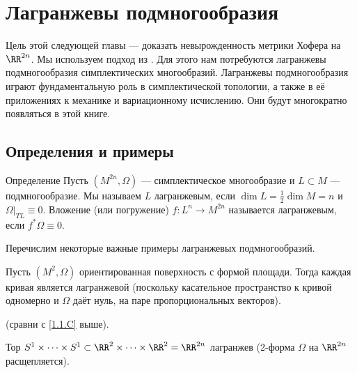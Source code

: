 \chapter{Лагранжевы подмногообразия}

Цель этой следующей главы --- доказать невырожденность метрики Хофера на $\RR^{2n}$.
Мы используем подход из \cite{P1}.
Для этого нам потребуются лагранжевы подмногообразия симплектических многообразий.
Лагранжевы подмногообразия играют фундаментальную роль в симплектической топологии, а также в её приложениях к механике и вариационному исчислению.
Они будут многократно появляться в этой книге.

\section{Определения и примеры}\label{3.1}

\begin{thm*}{Определение}
Пусть $(M^{2n}, \Omega)$ --- симплектическое многообразие и $L \subset M$ --- подмногообразие.
Мы называем $L$ лагранжевым, если $\dim L = \tfrac12 \dim M = n$ и $\Omega|_{TL} \equiv 0$.
Вложение (или погружение) $f\colon L^n \to M^{2n}$ называется лагранжевым, если $f^\ast \Omega \equiv 0$.
\end{thm*}

Перечислим некоторые важные примеры лагранжевых подмногообразий.

\begin{thm}{}\label{3.1.А} 
\end{thm}


Пусть $(M^2, \Omega)$ ориентированная поверхность с формой площади.
Тогда каждая кривая является лагранжевой (поскольку касательное пространство к кривой одномерно и $\Omega$ даёт нуль, на паре пропорциональных векторов).

\begin{thm}{}\label{3.1.B} (сравни с \ref{1.1.C} выше).
\end{thm}

Тор $S^1 \times\dots\times S^1
\subset 
\RR^2\times\dots\times \RR^2 
= 
\RR^{2n}$ лагранжев (2-форма $\Omega$ на $\RR^{2n}$ расщепляется).


\begin{thm}{}\label{3.1.C}
\end{thm}

